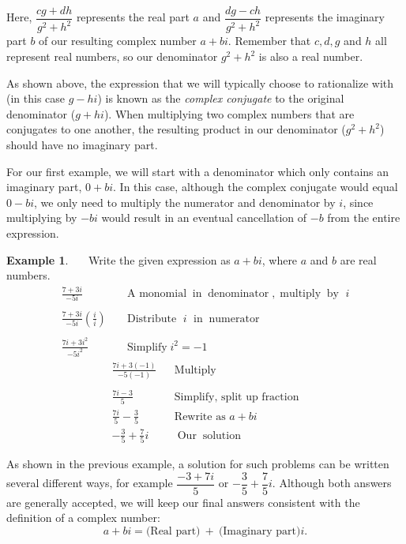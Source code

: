 \documentclass[12pt]{book}
\theoremstyle{definition}
\newtheorem{example}{Example}
\newcommand{\tmop}[1]{\ensuremath{\operatorname{#1}}}
\begin{document}
Here, $\dfrac{cg+dh}{g^2+h^2}$ represents the real part $a$ and $\dfrac{dg-ch}{g^2+h^2}$ represents the imaginary part $b$ of our resulting complex number $a+bi$.  Remember that $c,d,g$ and $h$ all represent real numbers, so our denominator $g^2+h^2$ is also a real number.\par
As shown above, the expression that we will typically choose to rationalize with (in this case $g-hi$) is known as the \textit{complex conjugate} to the original denominator ($g+hi$).  When multiplying two complex numbers that are conjugates to one another, the resulting product in our denominator ($g^2+h^2$) should have no imaginary part.\par
For our first example, we will start with a denominator which only contains an imaginary part, $0+bi$.  In this case, although the complex conjugate would equal $0-bi$, we only need to multiply the numerator and denominator by $i$, since multiplying by $-bi$ would result in an eventual cancellation of $-b$ from the entire expression.
 \begin{example}~~~Write the given expression as $a+bi$, where $a$ and $b$ are real numbers.
  \begin{eqnarray*}
    \frac{7 + 3 i}{- 5 i} &  & \tmop{A~monomial} \tmop{in}
    \tmop{denominator}, \tmop{multiply} \tmop{by~} i\\
    &  & \\
    \frac{7 + 3 i}{- 5 i} \left( \frac{i}{i} \right) &  & \tmop{Distribute~} i
    \tmop{~in} \tmop{numerator}\\
  	&  & \\
    \frac{7 i + 3 i^2}{- 5 i^2} &  & \tmop{Simplify} i^2 = - 1%
  \end{eqnarray*}
	\begin{eqnarray*}
	  \frac{7 i + 3 (- 1)}{- 5 (- 1)} &  & \tmop{Multiply}\\
    &  & \\
    \frac{7 i - 3}{5} & & \text{Simplify, split up fraction}\\
		\frac{7 i}{5} - \frac{3}{5} & & \text{Rewrite as~}a+bi\\
		-\frac{3}{5} + \frac{7}{5} i &  & \tmop{Our} \tmop{solution}
  \end{eqnarray*}
\end{example}
As shown in the previous example, a solution for such problems can be written several different ways, for
example $\dfrac{- 3 + 7 i}{5}$ or $-\dfrac{3}{5} + \dfrac{7}{5} i$.  Although both answers are generally accepted, we will keep our final answers consistent with the definition of a complex number: $$a+bi=\text{(Real part)}\ + \ \text{(Imaginary part)}i.$$
\end{document}
